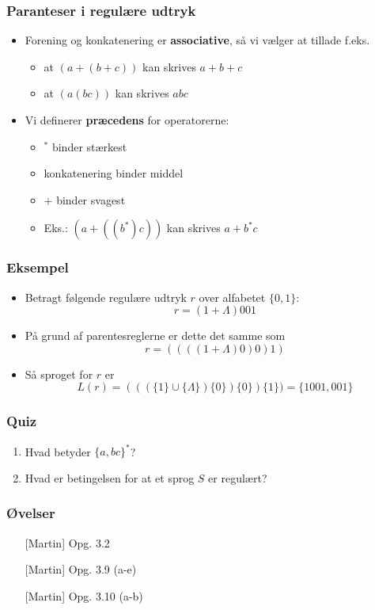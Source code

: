 \documentclass[]{beamer}
\begin{document}
\begin{frame}
\frametitle{Paranteser i regulære udtryk}
\begin{itemize}[<+->]
\item Forening og konkatenering er \textbf{associative}, så vi vælger at tillade f.eks.
\begin{itemize}
\item at $(a+(b+c))$ kan skrives $a+b+c$
\item at $(a(bc))$ kan skrives $abc$
\end{itemize}
\item Vi definerer \textbf{præcedens} for operatorerne:
\begin{itemize}
\item ${}^*$ binder stærkest
\item konkatenering binder middel
\item $+$ binder svagest
\item Eks.:   $(a+((b^*)c))$ kan skrives $a+b^*c$
\end{itemize}
\end{itemize}
\end{frame}

\begin{frame}
\frametitle{Eksempel}
\begin{itemize}[<+->]
\item Betragt følgende regulære udtryk $r$ over alfabetet $\{0,1\}$:
\[r = (1+Λ)001\]
\item På grund af parentesreglerne er dette det samme som
\[r = ((((1+Λ)0)0)1)\]
\item Så sproget for $r$ er
\[L(r) = (((\{1\}∪\{Λ\})\{0\})\{0\})\{1\})
 = \{1001,001\}\]
\end{itemize}
\end{frame}

\begin{frame}
\frametitle{Quiz}
\begin{enumerate}
\item Hvad betyder $\{a,bc\}^*$?
\item Hvad er betingelsen for at et 
sprog $S$ er regulært?
\end{enumerate}
\end{frame}

\begin{frame}
\frametitle{Øvelser}
\begin{itemize}
\item[] [Martin] Opg. 3.2
\item[] [Martin] Opg. 3.9 (a-e)
\item[] [Martin] Opg. 3.10 (a-b)
\end{itemize}
\end{frame}
\end{document}
